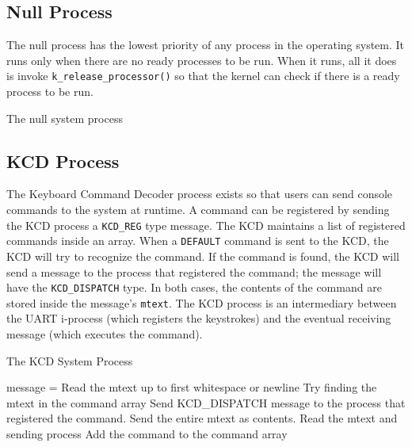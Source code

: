 \documentclass[12pt]{report}
\begin{document}
\subsection{Null Process}

The null process has the lowest priority of any process in the operating system. It runs only when there are no ready processes to be run. When it runs, all it does is invoke {\tt k\_release\_processor()} so that the kernel can check if there is a ready process to be run.

\begin{algorithm}
  \caption{The null system process}
  \begin{algorithmic}[1]
			\State {}
		\EndWhile
    \EndProcedure
  \end{algorithmic}
\end{algorithm}

\subsection{KCD Process}

The Keyboard Command Decoder process exists so that users can send console commands to the system at runtime. A command can be registered by sending the KCD process a {\tt KCD\_REG} type message. The KCD maintains a list of registered commands inside an array. When a {\tt DEFAULT} command is sent to the KCD, the KCD will try to recognize the command. If the command is found, the KCD will send a message to the process that registered the command; the message will have the {\tt KCD_DISPATCH} type. In both cases, the contents of the command are stored inside the message's {\tt mtext}. The KCD process is an intermediary between the UART i-process (which registers the keystrokes) and the eventual receiving message (which executes the command).\\

\begin{algorithm}
  \caption{The KCD System Process}
  \begin{algorithmic}[1]
			\State message = 
				\State Read the mtext up to first whitespace or newline
				\State Try finding the mtext in the command array
					\State Send KCD_DISPATCH message to the process that registered the command. Send the entire mtext as contents.
				\EndIf
				\State Read the mtext and sending process
				\State Add the command to the command array
			\EndIf
			\State {}
		\EndWhile
    \EndProcedure
  \end{algorithmic}
\end{algorithm}
\end{document}
